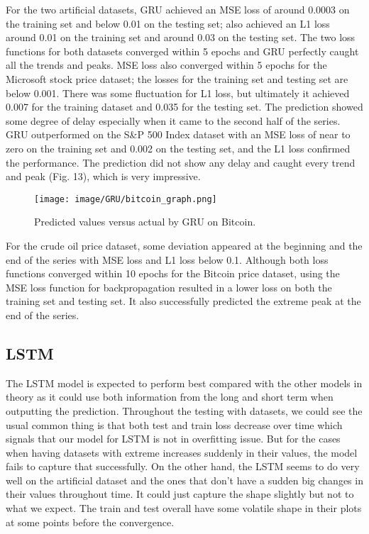 \documentclass[letterpaper, 10 pt, conference]{ieeeconf}  %
\begin{document}
        For the two artificial datasets, GRU achieved an MSE loss of around 0.0003 on the training set and below 0.01 on the testing set; also achieved an L1 loss around 0.01 on the training set and around 0.03 on the testing set. The two loss functions for both datasets converged within 5 epochs and GRU perfectly caught all the trends and peaks. MSE loss also converged within 5 epochs for the Microsoft stock price dataset; the losses for the training set and testing set are below 0.001. There was some fluctuation for L1 loss, but ultimately it achieved 0.007 for the training dataset and 0.035 for the testing set. The prediction showed some degree of delay especially when it came to the second half of the series. GRU outperformed on the S\&P 500 Index dataset with an MSE loss of near to zero on the training set and 0.002 on the testing set, and the L1 loss confirmed the performance. The prediction did not show any delay and caught every trend and peak (Fig. 13), which is very impressive.

        \begin{figure}[h]
            \centering
            \texttt{[image: image/GRU/bitcoin\_graph.png]}
            \caption{Predicted values versus actual by GRU on Bitcoin.}
            \label{figurelabel}
        \end{figure}
        
        For the crude oil price dataset, some deviation appeared at the beginning and the end of the series with MSE loss and L1 loss below 0.1. Although both loss functions converged within 10 epochs for the Bitcoin price dataset, using the MSE loss function for backpropagation resulted in a lower loss on both the training set and testing set. It also successfully predicted the extreme peak at the end of the series.

    \subsection{LSTM}

        The LSTM model is expected to perform best compared with the other models in theory as it could use both information from the long and short term when outputting the prediction. Throughout the testing with datasets, we could see the usual common thing is that both test and train loss decrease over time which signals that our model for LSTM is not in overfitting issue. But for the cases when having datasets with extreme increases suddenly in their values, the model fails to capture that successfully. On the other hand, the LSTM seems to do very well on the artificial dataset and the ones that don’t have a sudden big changes in their values throughout time. It could just capture the shape slightly but not to what we expect. The train and test overall have some volatile shape in their plots at some points before the convergence.
\end{document}
